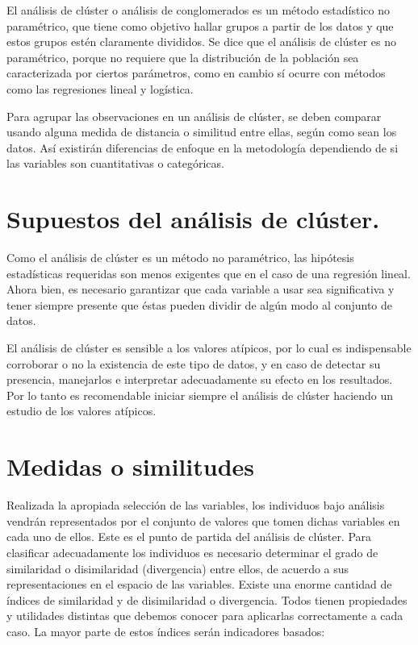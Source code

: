 \documentclass[12pt,]{krantz}
\begin{document}
El análisis de clúster o análisis de conglomerados es un método estadístico no paramétrico, que tiene como objetivo hallar grupos a partir de los datos y que estos grupos estén claramente divididos. Se dice que el análisis de clúster es no paramétrico, porque no requiere que la distribución de la población sea caracterizada por ciertos parámetros, como en cambio sí ocurre con métodos como las regresiones lineal y logística.

Para agrupar las observaciones en un análisis de clúster, se deben comparar usando alguna medida de distancia o similitud entre ellas, según como sean los datos. Así existirán diferencias de enfoque en la metodología dependiendo de si las variables son cuantitativas o categóricas.

\hypertarget{supuestos-del-analisis-de-cluster.}{%
\section{Supuestos del análisis de clúster.}\label{supuestos-del-analisis-de-cluster.}}

Como el análisis de clúster es un método no paramétrico, las hipótesis estadísticas requeridas son menos exigentes que en el caso de una regresión lineal. Ahora bien, es necesario garantizar que cada variable a usar sea significativa y tener siempre presente que éstas pueden dividir de algún modo al conjunto de datos.

El análisis de clúster es sensible a los valores atípicos, por lo cual es indispensable corroborar o no la existencia de este tipo de datos, y en caso de detectar su presencia, manejarlos e interpretar adecuadamente su efecto en los resultados. Por lo tanto es recomendable iniciar siempre el análisis de clúster haciendo un estudio de los valores atípicos.

\hypertarget{medidas-o-similitudes}{%
\section{Medidas o similitudes}\label{medidas-o-similitudes}}

Realizada la apropiada selección de las variables, los individuos bajo análisis vendrán representados por el conjunto de valores que tomen dichas variables en cada uno de ellos. Este es el punto de partida del análisis de clúster. Para clasificar adecuadamente los individuos es necesario determinar el grado de similaridad o disimilaridad (divergencia) entre ellos, de acuerdo a sus representaciones en el espacio de las variables.
Existe una enorme cantidad de índices de similaridad y de disimilaridad o divergencia. Todos tienen propiedades y utilidades distintas que debemos conocer para aplicarlas correctamente a cada caso.
La mayor parte de estos índices serán indicadores basados:
\end{document}
